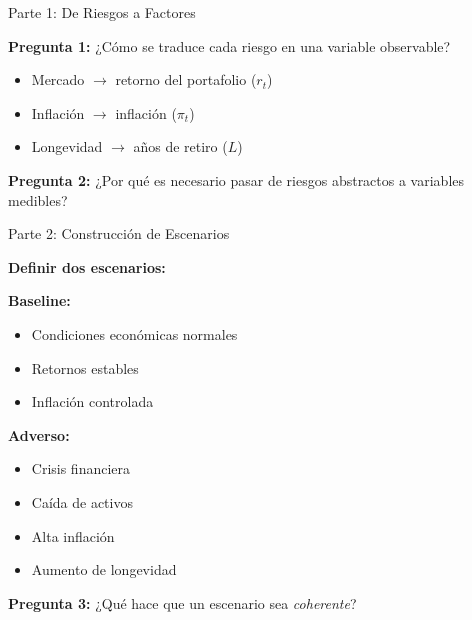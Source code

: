 \documentclass{beamer}
\begin{document}
\begin{frame}{Parte 1: De Riesgos a Factores}

\textbf{Pregunta 1:}  
¿Cómo se traduce cada riesgo en una variable observable?

\vspace{0.4cm}

\begin{itemize}
\item Mercado $\rightarrow$ retorno del portafolio ($r_t$)
\item Inflación $\rightarrow$ inflación ($\pi_t$)
\item Longevidad $\rightarrow$ años de retiro ($L$)
\end{itemize}

\vspace{0.4cm}

\textbf{Pregunta 2:}  
¿Por qué es necesario pasar de riesgos abstractos a variables medibles?

\end{frame}

\begin{frame}{Parte 2: Construcción de Escenarios}

\textbf{Definir dos escenarios:}

\vspace{0.3cm}

\textbf{Baseline:}
\begin{itemize}
\item Condiciones económicas normales
\item Retornos estables
\item Inflación controlada
\end{itemize}

\vspace{0.3cm}

\textbf{Adverso:}
\begin{itemize}
\item Crisis financiera
\item Caída de activos
\item Alta inflación
\item Aumento de longevidad
\end{itemize}

\vspace{0.4cm}

\textbf{Pregunta 3:}  
¿Qué hace que un escenario sea \textit{coherente}?

\end{frame}
\end{document}
